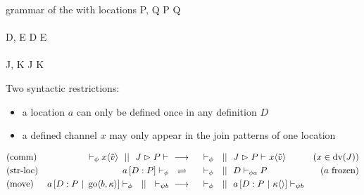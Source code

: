 \begin{JDef}{grammar of the \joincalc with locations}
  P, Q
  \grmr {}
  \altn {}
  \altn P \jpar Q
  \altn \jnullproc
  \altn {}
  \\ \\
  D, E
  \grmr {}
  \altn D \jcon E
  \altn \jnulldef
  \altn {}
  \\ \\
  J, K
  \grmr {}
  \altn J \jpat K
\end{JDef}

Two syntactic restrictions:
\begin{itemize}
  \item a location $a$ can only be defined once in any definition $D$
  \item a defined channel $x$ may only appear in the join patterns of one location
\end{itemize}

\begin{align*}
  \drchamred{comm}{(x \in \dv{J})}{
    \drchamcnf{\phi}{}{\jsnd{x}{\tilde{v}}}
    \drchampar
    \drchamcnf{}{\jrct{J}{P}}{}
  }{
    \drchamcnf{\phi}{}{}
    \drchampar
    \drchamcnf{}{\jrct{J}{P}}{\jsnd{x}{\tilde{v}}}
  }
  \\
  \drchamequ{str-loc}{(a \ \text{frozen)}}{
    \drchamcnf{\phi}{\jloc{a}{D}{P}}{}
  }{
    \drchamcnf{\phi}{}{}
    \drchampar
    \drchamcnf{\phi a}{D}{P}
  }
  \\
  \drchamred{move}{}{
    \drchamcnf{\phi}{\jloc{a}{D}{P \jpar \jgo{b}{\kappa}}}{}
    \drchampar
    \drchamcnf{\psi b}{}{}
  }{
    \drchamcnf{\phi}{}{}
    \drchampar
    \drchamcnf{\psi b}{\jloc{a}{D}{P \jpar \jsnd{\kappa}{}}}{}
  }
\end{align*}
